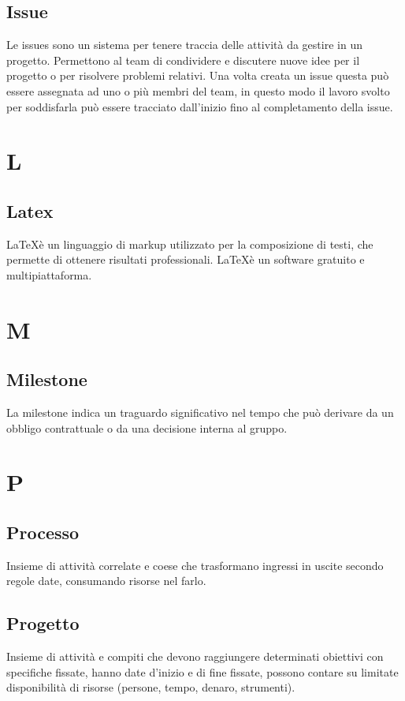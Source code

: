 	\subsection{Issue}
	Le issues sono un sistema per tenere traccia delle attività da gestire in un progetto. Permettono al team di condividere e discutere nuove idee per il progetto o per risolvere problemi relativi. Una volta creata un issue questa può essere assegnata ad uno o più membri del team, in questo modo il lavoro svolto per soddisfarla può essere tracciato dall'inizio fino al completamento della issue.
	
	\section{L}
	\subsection{Latex} 
	\LaTeX è un linguaggio di markup utilizzato per la composizione di testi, che permette di ottenere risultati professionali. \LaTeX è un software gratuito e multipiattaforma.

	\section{M}
	\subsection{Milestone} 
	La milestone indica un traguardo significativo nel tempo che può derivare da un obbligo contrattuale o da una decisione interna al gruppo.

	\section{P}
	\subsection{Processo} 
	Insieme di attività correlate e coese che trasformano ingressi in uscite secondo regole date, consumando risorse nel farlo.

	\subsection{Progetto} 
	Insieme di attività e compiti che devono raggiungere determinati obiettivi con specifiche fissate, hanno date d'inizio e di fine fissate, possono contare su limitate disponibilità di risorse (persone, tempo, denaro, strumenti).
	
